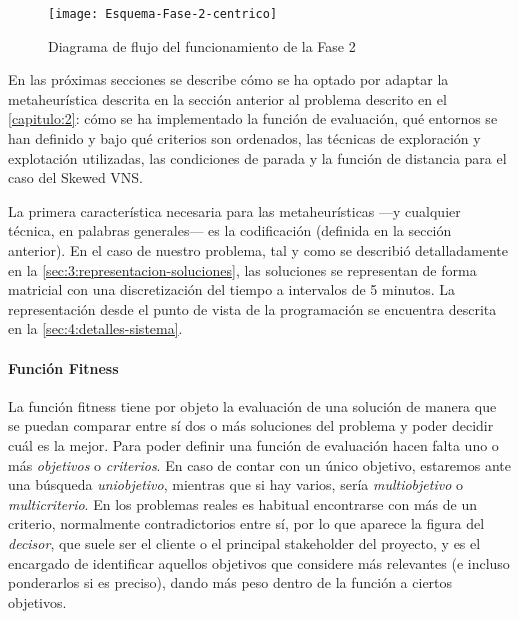 \begin{figure}[htbp]
    \centering
    \texttt{[image: Esquema-Fase-2-centrico]}
    \caption{Diagrama de flujo del funcionamiento de la Fase 2}
    \label{fig:esquema-fase2}
\end{figure}

\vspace*{\fill}


En las próximas secciones se describe cómo se ha optado por adaptar la metaheurística descrita en la sección anterior al problema descrito en el \autoref{capitulo:2}: cómo se ha implementado la función de evaluación, qué entornos se han definido y bajo qué criterios son ordenados, las técnicas de exploración y explotación utilizadas, las condiciones de parada y la función de distancia para el caso del Skewed VNS.

La primera característica necesaria para las metaheurísticas ---y cualquier técnica, en palabras generales--- es la codificación (definida en la sección anterior). En el caso de nuestro problema, tal y como se describió detalladamente en la \autoref{sec:3:representacion-soluciones}, las soluciones se representan de forma matricial con una discretización del tiempo a intervalos de 5 minutos. La representación desde el punto de vista de la programación se encuentra descrita en la \autoref{sec:4:detalles-sistema}.


\paragraph{Función Fitness} \label{apartado:adaptacion-fitness}

La función fitness tiene por objeto la evaluación de una solución de manera que se puedan comparar entre sí dos o más soluciones del problema y poder decidir cuál es la mejor. Para poder definir una función de evaluación hacen falta uno o más \textit{objetivos} o \textit{criterios}. En caso de contar con un único objetivo, estaremos ante una búsqueda \textit{uniobjetivo}, mientras que si hay varios, sería \textit{multiobjetivo} o \textit{multicriterio}. En los problemas reales es habitual encontrarse con más de un criterio, normalmente contradictorios entre sí, por lo que aparece la figura del \textit{decisor}, que suele ser el cliente o el principal stakeholder del proyecto, y es el encargado de identificar aquellos objetivos que considere más relevantes (e incluso ponderarlos si es preciso), dando más peso dentro de la función a ciertos objetivos.

